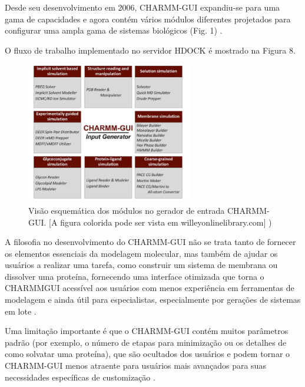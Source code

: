\documentclass[11pt, letterpaper, portuguese]{article}
\begin{document}
        
        \par Desde seu desenvolvimento em 2006, CHARMM-GUI expandiu-se para uma gama de capacidades e agora contém vários módulos diferentes projetados para configurar uma ampla gama de sistemas biológicos (Fig. 1) \cite{Jo_2017}.
        
        \par O fluxo de trabalho implementado no servidor HDOCK é mostrado na Figura 8.
        \begin{figure}
	    \centering
		\caption{Visão esquemática dos módulos no gerador de entrada CHARMM-GUI. [A figura colorida pode ser vista em willeyonlinelibrary.com]\cite{Jo_2017} )}
		\includegraphics[width=0.65\textwidth]{images/Imagen 1.png}
	\end{figure}\textbf{}
        
        \par A filosofia no desenvolvimento do CHARMM-GUI não se trata tanto de fornecer os elementos essenciais da modelagem molecular, mas também de ajudar os usuários a realizar uma tarefa, como construir um sistema de membrana ou dissolver uma proteína, fornecendo uma interface otimizada que torna o CHARMMGUI acessível aos usuários com menos experiência em ferramentas de modelagem e ainda útil para especialistas, especialmente por gerações de sistemas em lote \cite{Jo_2017}.
        
       \par Uma limitação importante é que o CHARMM-GUI contém muitos parâmetros padrão (por exemplo, o número de etapas para minimização ou os detalhes de como solvatar uma proteína), que são ocultados dos usuários e podem tornar o CHARMM-GUI menos atraente para usuários mais avançados para suas necessidades específicas de customização \cite{Jo_2017}. 
\end{document}
